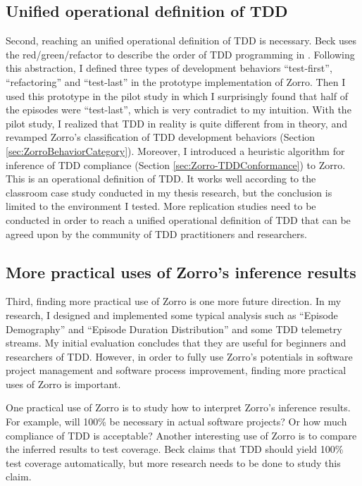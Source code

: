 \subsection{Unified operational definition of TDD}
Second, reaching an unified operational definition of TDD is necessary. Beck uses the red/green/refactor to describe the order of TDD programming in \cite{Beck:03}. %
Following this abstraction, I defined three types of development behaviors ``test-first'', ``refactoring'' and ``test-last'' in the prototype implementation of Zorro. Then I used this prototype in the pilot study in which I surprisingly found that half of the episodes were ``test-last'', which is very contradict to my intuition. With the pilot study, I realized that TDD in reality is quite different from in theory, and revamped Zorro's classification of TDD development behaviors (Section \ref{sec:ZorroBehaviorCategory}). Moreover, I introduced a heuristic algorithm for inference of TDD compliance (Section \ref{sec:Zorro-TDDConformance}) to Zorro. This is an operational definition of TDD. It works well according to the classroom case study conducted in my thesis research, but the conclusion is limited to the environment I tested. More replication studies need to be conducted in order to reach a unified operational definition of TDD that can be agreed upon by the community of TDD practitioners and researchers.

\subsection{More practical uses of Zorro's inference results}
Third, finding more practical use of Zorro is one more future direction. In my research, I designed and implemented some typical analysis such as ``Episode Demography'' and ``Episode Duration Distribution'' and some TDD telemetry streams. My initial evaluation concludes that they are useful for beginners and researchers of TDD. However, in order to fully use Zorro's potentials in software project management and software process improvement, finding more practical uses of Zorro is important. 

One practical use of Zorro is to study how to interpret Zorro's inference results. For example, will 100\% be necessary in actual software projects? Or how much compliance of TDD is acceptable?
Another interesting use of Zorro is to compare the inferred results to test coverage. Beck claims that TDD should yield 100\% test coverage automatically, but more research needs to be done to study this claim. 

